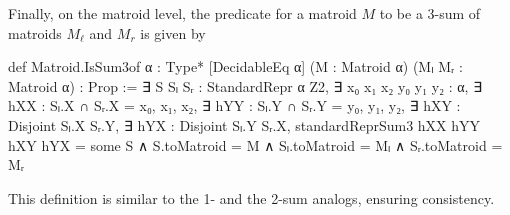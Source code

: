 Finally, on the matroid level, the predicate for a matroid $M$ to be a 3-sum of matroids $M_{\ell}$ and $M_{r}$ is given by
\begin{leancode}
def Matroid.IsSum3of {α : Type*} [DecidableEq α]
    (M : Matroid α) (Mₗ Mᵣ : Matroid α) :
    Prop :=
  ∃ S Sₗ Sᵣ : StandardRepr α Z2,
  ∃ x₀ x₁ x₂ y₀ y₁ y₂ : α,
  ∃ hXX : Sₗ.X ∩ Sᵣ.X = {x₀, x₁, x₂},
  ∃ hYY : Sₗ.Y ∩ Sᵣ.Y = {y₀, y₁, y₂},
  ∃ hXY : Disjoint Sₗ.X Sᵣ.Y,
  ∃ hYX : Disjoint Sₗ.Y Sᵣ.X,
  standardReprSum3 hXX hYY hXY hYX = some S
  ∧ S.toMatroid = M
  ∧ Sₗ.toMatroid = Mₗ
  ∧ Sᵣ.toMatroid = Mᵣ
\end{leancode}
This definition is similar to the 1- and the 2-sum analogs, ensuring consistency.
